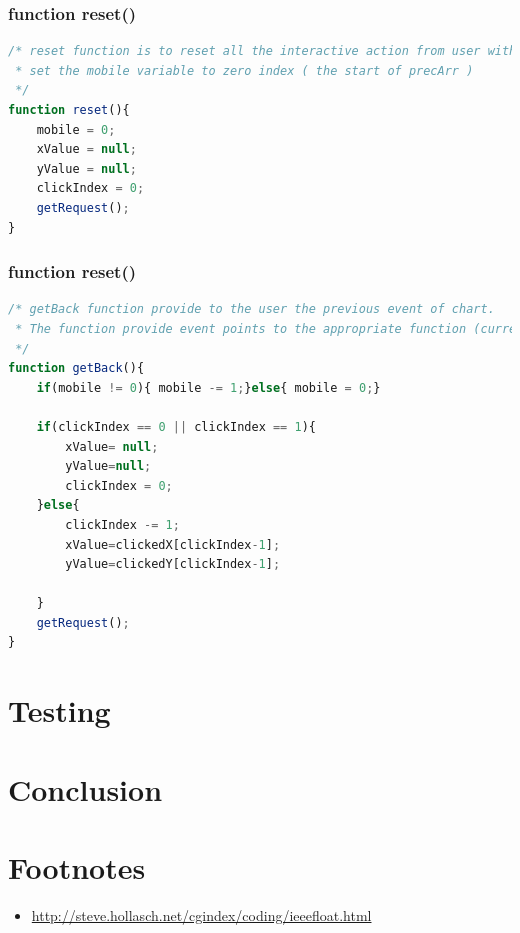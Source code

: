 \documentclass[11pt]{article}
\begin{document}
\subsubsection{function reset()}

\begin{lstlisting}[label={lst:checkIndex}, language=Javascript, caption={reset function is to reset all the interactive action from user with chart, and get back to the first stage},]
/* reset function is to reset all the interactive action from user with chart.
 * set the mobile variable to zero index ( the start of precArr )
 */
function reset(){
	mobile = 0;
	xValue = null;
	yValue = null;
	clickIndex = 0;
	getRequest();
}
\end{lstlisting}

\subsubsection{function reset()}

\begin{lstlisting}[label={lst:checkIndex}, language=Javascript, caption={getBack function provide to the user the previous stage of chart},]
/* getBack function provide to the user the previous event of chart. 
 * The function provide event points to the appropriate function (current )
 */
function getBack(){
	if(mobile != 0){ mobile -= 1;}else{ mobile = 0;}

	if(clickIndex == 0 || clickIndex == 1){
		xValue= null;
		yValue=null;
		clickIndex = 0;
	}else{
		clickIndex -= 1;
		xValue=clickedX[clickIndex-1]; 
		yValue=clickedY[clickIndex-1];
		
	}
	getRequest();
}
\end{lstlisting}



\section{Testing}



\section{Conclusion}

\section*{Footnotes}
\begin{itemize}
\item \url{http://steve.hollasch.net/cgindex/coding/ieeefloat.html}
\end{itemize}
\appendix
\begin{appendices}

\end{appendices}
\end{document}
